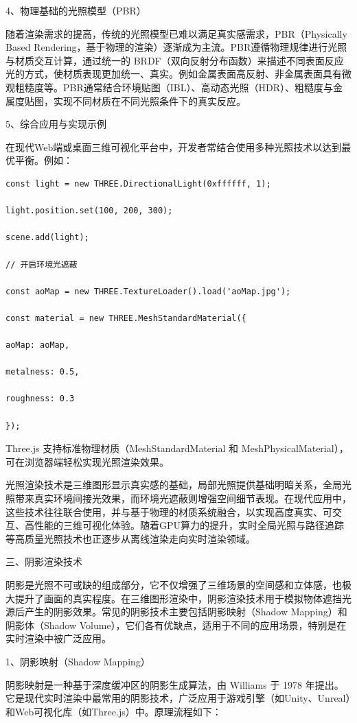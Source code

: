 4、物理基础的光照模型（PBR）

随着渲染需求的提高，传统的光照模型已难以满足真实感需求，PBR（Physically Based Rendering，基于物理的渲染）逐渐成为主流。PBR遵循物理规律进行光照与材质交互计算，通过统一的 BRDF（双向反射分布函数）来描述不同表面反应光的方式，使材质表现更加统一、真实。例如金属表面高反射、非金属表面具有微观粗糙度等。PBR通常结合环境贴图（IBL）、高动态光照（HDR）、粗糙度与金属度贴图，实现不同材质在不同光照条件下的真实反应。

5、综合应用与实现示例

在现代Web端或桌面三维可视化平台中，开发者常结合使用多种光照技术以达到最优平衡。例如：

\begin{lstlisting}[style=javascript]
const light = new THREE.DirectionalLight(0xffffff, 1);

light.position.set(100, 200, 300);

scene.add(light);

// 开启环境光遮蔽

const aoMap = new THREE.TextureLoader().load('aoMap.jpg');

const material = new THREE.MeshStandardMaterial({

aoMap: aoMap,

metalness: 0.5,

roughness: 0.3

});

\end{lstlisting}

Three.js 支持标准物理材质（MeshStandardMaterial 和 MeshPhysicalMaterial），可在浏览器端轻松实现光照渲染效果。

光照渲染技术是三维图形显示真实感的基础，局部光照提供基础明暗关系，全局光照带来真实环境间接光效果，而环境光遮蔽则增强空间细节表现。在现代应用中，这些技术往往联合使用，并与基于物理的材质系统融合，以实现高度真实、可交互、高性能的三维可视化体验。随着GPU算力的提升，实时全局光照与路径追踪等高质量光照技术也正逐步从离线渲染走向实时渲染领域。

三、阴影渲染技术

阴影是光照不可或缺的组成部分，它不仅增强了三维场景的空间感和立体感，也极大提升了画面的真实程度。在三维图形渲染中，阴影渲染技术用于模拟物体遮挡光源后产生的阴影效果。常见的阴影技术主要包括阴影映射（Shadow Mapping）和阴影体（Shadow Volume），它们各有优缺点，适用于不同的应用场景，特别是在实时渲染中被广泛应用。

1、阴影映射（Shadow Mapping）

阴影映射是一种基于深度缓冲区的阴影生成算法，由 Williams 于 1978 年提出。它是现代实时渲染中最常用的阴影技术，广泛应用于游戏引擎（如Unity、Unreal）和Web可视化库（如Three.js）中。原理流程如下：

